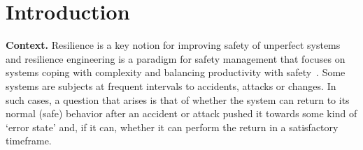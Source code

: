 \documentclass[runningheads]{llncs}
\newcommand{\alain}[1]{\todo[inline,color=red!20]{{\bf AF:} #1}}
\begin{document}


\newcommand{\LCM}{\mathsf{LCM}}
\newcommand{\LOGSPACE}{\mathsf{LOGSPACE}}
\newcommand{\MSO}{\mathsf{MSO}}
\newcommand{\SO}{\mathsf{SO}}

 \newcommand{\N}{\mathds{N}}



\section{Introduction}\label{section introduction}


{\bf Context.} 
Resilience is a key notion for improving safety of unperfect systems and resilience engineering is a paradigm for safety management that focuses on systems coping with complexity and balancing productivity with safety~\cite{challenges}. Some systems are subjects at frequent intervals to accidents, attacks or changes. 
In such cases, a question that arises is that of whether the system can return to its normal (safe) behavior after an accident or attack
pushed it towards some kind of ‘error state’ and, if it can, whether it can perform the return in a satisfactory timeframe. 
\end{document}

